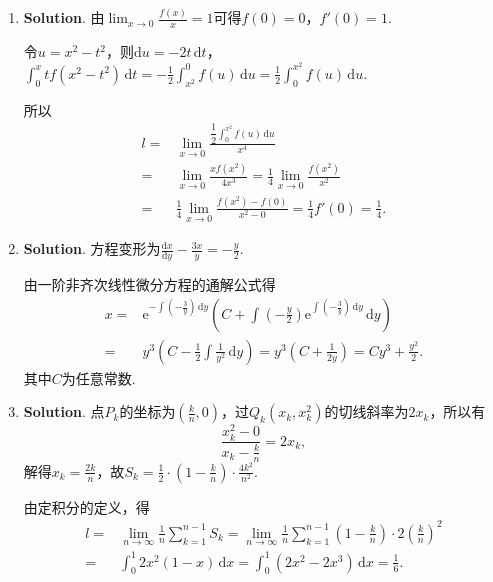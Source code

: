 \documentclass[../main.tex]{subfiles}
\begin{document}
\begin{enumerate}
          计算$f(-1)=6$，$f\left(-\frac{1}{9}\right)=-\frac{14}{243}$，$f(1)=2$，$f(2
              )=-6$，

          所以$f(x)$在区间$[-1,2]$上的最大值为$6$，最小值为$-6$.

    \item \textbf{Solution}. 由$\lim_{x\to0}\frac{f(x)}{x}=1$可得$f(0)=0$，$f
              '(0)=1$.

          令$u=x^{2}-t^{2}$，则$\mathrm{d}u=-2t\,\mathrm{d}t$，$\int_{0}^{x}tf(x^{2}-t^{2}
              )\,\mathrm{d}t=-\frac{1}{2}\int_{x^2}^{0}f(u)\,\mathrm{d}u=\frac{1}{2}\int_{0}^{x^2}
              f(u)\,\mathrm{d}u$.

          所以
          \[
              \begin{aligned}
                  l = {} & \lim_{x\to0}\frac{\dfrac{1}{2}\displaystyle\int_{0}^{x^2}f(u)\,\mathrm{d}u}{x^4}  \\
                  = {}   & \lim_{x\to0}\frac{xf(x^2)}{4x^3}= \frac{1}{4}\lim_{x\to0}\frac{f(x^2)}{x^2}       \\
                  = {}   & \frac{1}{4}\lim_{x\to0}\frac{f(x^2)-f(0)}{x^2-0}= \frac{1}{4}f'(0) = \frac{1}{4}.
              \end{aligned}
          \]

    \item \textbf{Solution}. 方程变形为$\frac{\mathrm{d}x}{\mathrm{d}y}-\frac{3x}{y}=-\frac{y}{2}$.

          由一阶非齐次线性微分方程的通解公式得
          \[
              \begin{aligned}
                  x = {} & \mathrm{e}^{-\int\left(-\frac{3}{y}\right)\,\mathrm{d}y}\left(C+\int\left(-\frac{y}{2}\right)\mathrm{e}^{\int\left(-\frac{3}{y}\right)\,\mathrm{d}y}\,\mathrm{d}y\right) \\
                  = {}   & y^{3}\left(C-\frac{1}{2}\int\frac{1}{y^2}\,\mathrm{d}y\right) = y^{3}\left(C+\frac{1}{2y}\right) = Cy^{3}+\frac{y^2}{2}.
              \end{aligned}
          \]
          其中$C$为任意常数.

    \item \textbf{Solution}. 点$P_{k}$的坐标为$\left(\frac{k}{n},0\right)$，过$Q
                  _{k}(x_{k},x_{k}^{2})$的切线斜率为$2x_{k}$，所以有
          \[
              \frac{x_{k}^{2}-0}{x_{k}-\frac{k}{n}}=2x_{k},
          \]
          解得$x_{k}=\frac{2k}{n}$，故$S_{k}=\frac{1}{2}\cdot\left(1-\frac{k}{n}\right
              )\cdot\frac{4k^{2}}{n^{2}}$.

          由定积分的定义，得
          \[
              \begin{aligned}
                  l = {} & \lim_{n\to\infty}\frac{1}{n}\sum_{k=1}^{n-1}S_{k} = \lim_{n\to\infty}\frac{1}{n}\sum_{k=1}^{n-1}\left(1-\frac{k}{n}\right)\cdot 2\left(\frac{k}{n}\right)^{2} \\
                  = {}   & \int_{0}^{1}2x^{2}(1-x)\,\mathrm{d}x = \int_{0}^{1}(2x^{2}-2x^{3})\,\mathrm{d}x = \frac{1}{6}.
              \end{aligned}
          \]
\end{enumerate}
\end{document}
